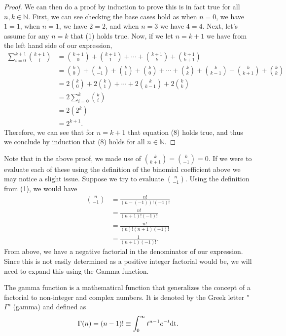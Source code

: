 \begin{proof}
	We can then do a proof by induction to prove this is in fact true for all $n,k \in \mathbb{N}$. First, we can see checking the base cases hold as when $n=0$, we have $1=1$, when $n=1$, we have $2=2$, and when $n=3$ we have $4=4$. Next, let's assume for any $n=k$ that (1) holds true. Now, if we let $n=k+1$ we have from the left hand side of our expression,
\begin{align}
	\sum_{i=0}^{k+1}{{k+1}\choose{i}}&={{k+1}\choose{0}}+{{k+1}\choose{1}}+\cdots+{{k+1}\choose{k}}+{{k+1}\choose{k+1}} \\
	&={{k}\choose{0}}+{{k}\choose{-1}}+{{k}\choose{1}}+{{k}\choose{0}}+\cdots+{{k}\choose{k}}+{{k}\choose{k-1}}+{{k}\choose{k+1}}+{{k}\choose{k}}\\
	&=2{{k}\choose{0}}+2{{k}\choose{1}}+\cdots+2{{k}\choose{k-1}}+2{{k}\choose{k}}\\
	&=2\sum_{i=0}^{k}{{k}\choose{i}}\\
	&=2(2^k)\\
	&=2^{k+1}.
\end{align}
Therefore, we can see that for $n=k+1$ that equation (8) holds true, and thus we conclude by induction that (8) holds for all $n\in\mathbb{N}$.
\end{proof} 

Note that in the above proof, we made use of ${{k}\choose{k+1}}={{k}\choose{-1}}=0$. If we were to evaluate each of these using the definition of the binomial coefficient above we may notice a slight issue. Suppose we try to evaluate ${{n}\choose{-1}}$. Using the definition from (1), we would have
\begin{align}
	{{n}\choose{-1}}&=\frac{n!}{(n-(-1))!(-1)!}\\&=\frac{n!}{(n+1)!(-1)!} \\
	&=\frac{n!}{(n)!(n+1)(-1)!} \\
	&=\frac{1}{(n+1)(-1)!}.
\end{align}
From above, we have a negative factorial in the denominator of our expression. Since this is not easily determined as a positive integer factorial would be, we will need to expand this using the Gamma function. 

\begin{defn}{1}
The gamma function is a mathematical function that generalizes the concept of a factorial to non-integer and complex numbers. It is denoted by the Greek letter "$\Gamma$" (gamma) and defined as
\begin{align}
	\Gamma(n)=(n-1)!\equiv\int_{0}^{\infty}t^{n-1}e^{-t}\textnormal{dt}.
\end{align}
\end{defn}

